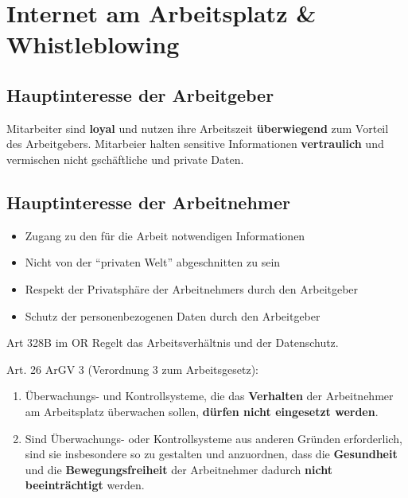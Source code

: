 \hypertarget{internet-am-arbeitsplatz-whistleblowing}{%
\section{Internet am Arbeitsplatz \&
Whistleblowing}\label{internet-am-arbeitsplatz-whistleblowing}}

\hypertarget{hauptinteresse-der-arbeitgeber}{%
\subsection{Hauptinteresse der
Arbeitgeber}\label{hauptinteresse-der-arbeitgeber}}

Mitarbeiter sind \textbf{loyal} und nutzen ihre Arbeitszeit
\textbf{überwiegend} zum Vorteil des Arbeitgebers. Mitarbeier halten
sensitive Informationen \textbf{vertraulich} und vermischen nicht
gschäftliche und private Daten.

\hypertarget{hauptinteresse-der-arbeitnehmer}{%
\subsection{Hauptinteresse der
Arbeitnehmer}\label{hauptinteresse-der-arbeitnehmer}}

\begin{itemize}
\tightlist
\item
  Zugang zu den für die Arbeit notwendigen Informationen
\item
  Nicht von der ``privaten Welt'' abgeschnitten zu sein
\item
  Respekt der Privatsphäre der Arbeitnehmers durch den Arbeitgeber
\item
  Schutz der personenbezogenen Daten durch den Arbeitgeber
\end{itemize}

Art 328B im OR Regelt das Arbeitsverhältnis und der Datenschutz.

Art. 26 ArGV 3 (Verordnung 3 zum Arbeitsgesetz):

\begin{enumerate}
\def\labelenumi{\arabic{enumi}.}
\tightlist
\item
  Überwachungs- und Kontrollsysteme, die das \textbf{Verhalten} der
  Arbeitnehmer am Arbeitsplatz überwachen sollen, \textbf{dürfen nicht
  eingesetzt werden}.\\
\item
  Sind Überwachungs- oder Kontrollsysteme aus anderen Gründen
  erforderlich, sind sie insbesondere so zu gestalten und anzuordnen,
  dass die \textbf{Gesundheit} und die \textbf{Bewegungsfreiheit} der
  Arbeitnehmer dadurch \textbf{nicht beeinträchtigt} werden.
\end{enumerate}

